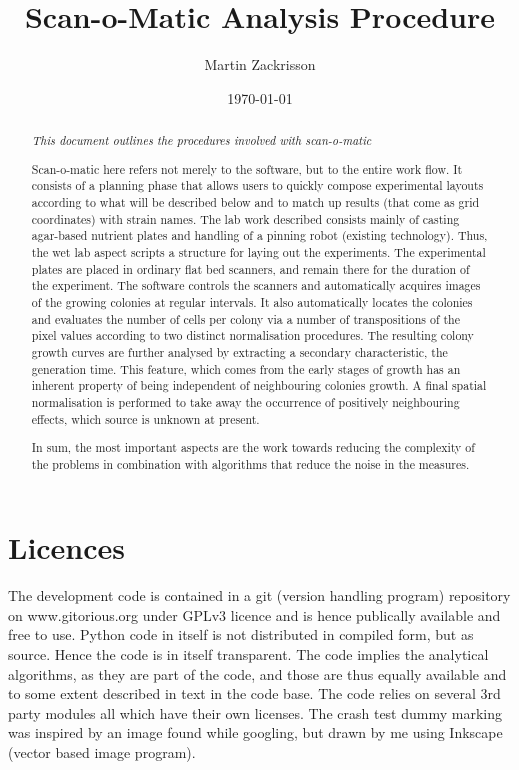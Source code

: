 \documentclass{article}
\title{Scan-o-Matic Analysis Procedure}
\author{Martin Zackrisson}
\date{\today}
\begin{document}
\maketitle
\begin{abstract}
\emph{This document outlines the procedures involved with scan-o-matic}

Scan-o-matic here refers not merely to the software, but to the entire work flow.
It consists of a planning phase that allows users to quickly compose 
experimental layouts according to what will be described below and to match up
results (that come as grid coordinates) with strain names.
The lab work described consists mainly of casting agar-based nutrient plates
and handling of a pinning robot (existing technology).
Thus, the wet lab aspect scripts a structure for laying out the experiments.
The experimental plates are placed in ordinary flat bed scanners, and 
remain there for the duration of the experiment.
The software controls the scanners and automatically acquires images of the 
growing colonies at regular intervals.
It also automatically locates the colonies and evaluates the number of cells
per colony via a number of transpositions of the pixel values according to
two distinct normalisation procedures.
The resulting colony growth curves are further analysed by extracting a
secondary characteristic, the generation time.
This feature, which comes from the early stages of growth has an
inherent property of being independent of neighbouring colonies growth.
A final spatial normalisation is performed to take away the occurrence of
positively neighbouring effects, which source is unknown at present.

In sum, the most important aspects are the work towards reducing the
complexity of the problems in combination with algorithms that reduce
the noise in the measures.

\end{abstract}

\section{Licences}

The development code is contained in a git (version handling program) 
repository on www.gitorious.org under GPLv3 licence and is hence publically
available and free to use.
Python code in itself is not distributed in compiled form, but as source.
Hence the code is in itself transparent.
The code implies the analytical algorithms, as they are part of the code,
and those are thus equally available and to some extent described in text
in the code base.
The code relies on several 3rd party modules all which have their own 
licenses.
The crash test dummy marking was inspired by an image found while googling,
but drawn by me using Inkscape (vector based image program).
\end{document}
